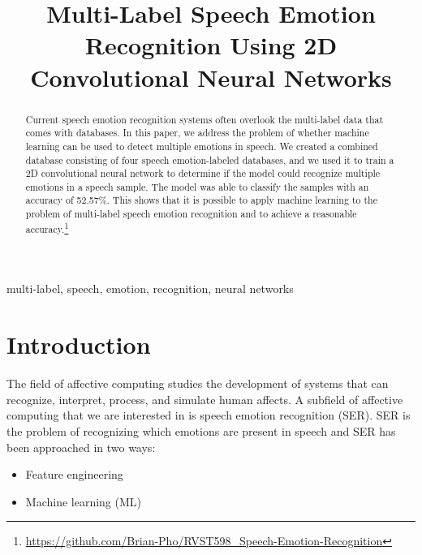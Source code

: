 \documentclass[conference]{IEEEtran}
\begin{document}
\title{Multi-Label Speech Emotion Recognition Using 2D Convolutional Neural Networks}

\author{
}

\maketitle

\begin{abstract}
Current speech emotion recognition systems often overlook the multi-label data that comes with databases. In this paper, we address the problem of whether machine learning can be used to detect multiple emotions in speech. We created a combined database consisting of four speech emotion-labeled databases, and we used it to train a 2D convolutional neural network to determine if the model could recognize multiple emotions in a speech sample. The model was able to classify the samples with an accuracy of 52.57\%. This shows that it is possible to apply machine learning to the problem of multi-label speech emotion recognition and to achieve a reasonable accuracy.\footnote{\url{https://github.com/Brian-Pho/RVST598_Speech-Emotion-Recognition}}
\end{abstract}

\begin{IEEEkeywords}
multi-label, speech, emotion, recognition, neural networks
\end{IEEEkeywords}

\section{Introduction}
The field of affective computing studies the development of systems that can recognize, interpret, process, and simulate human affects. A subfield of affective computing that we are interested in is speech emotion recognition (SER). SER is the problem of recognizing which emotions are present in speech and SER has been approached in two ways:
\begin{itemize}
	\item Feature engineering
	\item Machine learning (ML)
\end{itemize}
\end{document}
